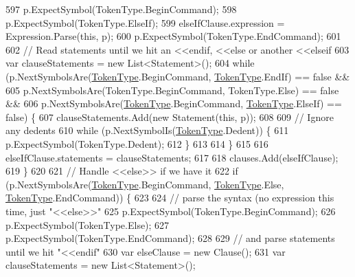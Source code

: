 \begin{DoxyCode}
597                     p.ExpectSymbol(TokenType.BeginCommand);
598                     p.ExpectSymbol(TokenType.ElseIf);
599                     elseIfClause.expression = Expression.Parse(\textcolor{keyword}{this}, p);
600                     p.ExpectSymbol(TokenType.EndCommand);
601 
602                     \textcolor{comment}{// Read statements until we hit an <<endif, <<else or another <<elseif}
603                     var clauseStatements = \textcolor{keyword}{new} List<Statement>();
604                     \textcolor{keywordflow}{while} (p.NextSymbolsAre(\hyperlink{a00051_a301aa7c866593a5b625a8fc158bbeace}{TokenType}.BeginCommand, 
      \hyperlink{a00051_a301aa7c866593a5b625a8fc158bbeace}{TokenType}.EndIf) == \textcolor{keyword}{false} &&
605                         p.NextSymbolsAre(TokenType.BeginCommand, TokenType.Else) == \textcolor{keyword}{false} &&
606                         p.NextSymbolsAre(\hyperlink{a00051_a301aa7c866593a5b625a8fc158bbeace}{TokenType}.BeginCommand, 
      \hyperlink{a00051_a301aa7c866593a5b625a8fc158bbeace}{TokenType}.ElseIf) == \textcolor{keyword}{false}) \{
607                         clauseStatements.Add(\textcolor{keyword}{new} Statement(\textcolor{keyword}{this}, p));
608 
609                         \textcolor{comment}{// Ignore any dedents}
610                         \textcolor{keywordflow}{while} (p.NextSymbolIs(\hyperlink{a00051_a301aa7c866593a5b625a8fc158bbeace}{TokenType}.Dedent)) \{
611                             p.ExpectSymbol(TokenType.Dedent);
612                         \}
613 
614                     \}
615 
616                     elseIfClause.statements = clauseStatements;
617 
618                     clauses.Add(elseIfClause);
619                 \}
620 
621                 \textcolor{comment}{// Handle <<else>> if we have it}
622                 \textcolor{keywordflow}{if} (p.NextSymbolsAre(\hyperlink{a00051_a301aa7c866593a5b625a8fc158bbeace}{TokenType}.BeginCommand, \hyperlink{a00051_a301aa7c866593a5b625a8fc158bbeace}{TokenType}.Else, 
      \hyperlink{a00051_a301aa7c866593a5b625a8fc158bbeace}{TokenType}.EndCommand)) \{
623 
624                     \textcolor{comment}{// parse the syntax (no expression this time, just "<<else>>"}
625                     p.ExpectSymbol(TokenType.BeginCommand);
626                     p.ExpectSymbol(TokenType.Else);
627                     p.ExpectSymbol(TokenType.EndCommand);
628 
629                     \textcolor{comment}{// and parse statements until we hit "<<endif"}
630                     var elseClause = \textcolor{keyword}{new} Clause();
631                     var clauseStatements = \textcolor{keyword}{new} List<Statement>();

\end{DoxyCode}

